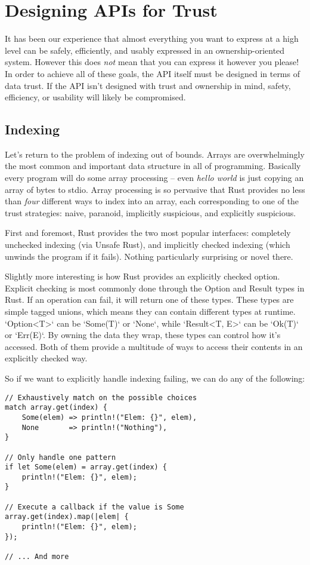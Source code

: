\chapter{Designing APIs for Trust}
\label{ch:design}

It has been our experience that almost everything you want to express at a high level
can be safely, efficiently, and usably expressed in an ownership-oriented system.
However this does \emph{not} mean that you can express it however you please!
In order to achieve all of these goals, the API itself must be designed in
terms of data trust. If the API isn't designed with trust and ownership in mind,
safety, efficiency, or usability will likely be compromised.




\section{Indexing}

Let's return to the problem of indexing out of bounds. Arrays are overwhelmingly
the most common and important data structure in all of programming. Basically every
program will do some array processing -- even \emph{hello world} is just copying an
array of bytes to stdio. Array processing is so pervasive that Rust provides no
less than \emph{four} different ways to index into an array, each corresponding to
one of the trust strategies: naive, paranoid, implicitly suspicious, and
explicitly suspicious.

First and foremost, Rust provides the two most popular interfaces: completely
unchecked indexing (via Unsafe Rust), and implicitly checked indexing (which
unwinds the program if it fails). Nothing particularly surprising or
novel there.

Slightly more interesting is how Rust provides an explicitly checked option.
Explicit checking is most commonly done through the Option and Result types
in Rust. If an operation can fail, it will return one of these types.
These types are simple tagged unions, which means they can contain different
types at runtime. `Option<T>` can be `Some(T)` or `None`, while `Result<T, E>`
can be `Ok(T)` or `Err(E)`. By owning the data they wrap, these types can control
how it's accessed. Both of them provide a multitude of ways to access their
contents in an explicitly checked way.

So if we want to explicitly handle indexing failing, we can do any of the
following:

\begin{verbatim}
// Exhaustively match on the possible choices
match array.get(index) {
    Some(elem) => println!("Elem: {}", elem),
    None       => println!("Nothing"),
}

// Only handle one pattern
if let Some(elem) = array.get(index) {
    println!("Elem: {}", elem);
}

// Execute a callback if the value is Some
array.get(index).map(|elem| {
    println!("Elem: {}", elem);
});

// ... And more
\end{verbatim}


